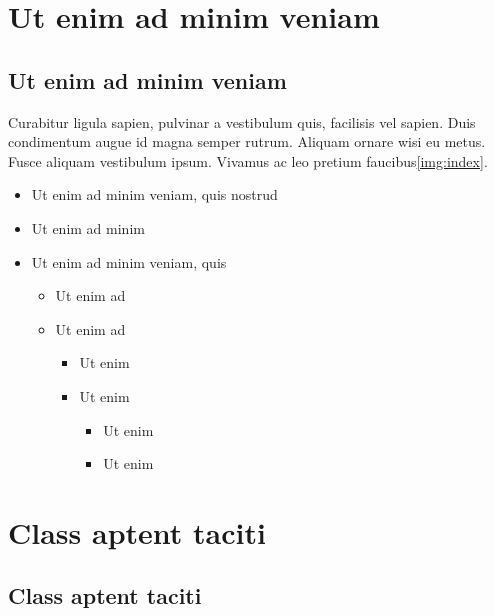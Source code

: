 \section{Ut enim ad minim veniam}

\lipsum[2-4]

\subsection{Ut enim ad minim veniam}

Curabitur ligula sapien, pulvinar a vestibulum quis, facilisis vel sapien. Duis condimentum augue id magna semper rutrum. Aliquam ornare wisi eu metus. Fusce aliquam vestibulum ipsum. Vivamus ac leo pretium faucibus\ref{img:index}.

\begin{itemize}
    \item Ut enim ad minim veniam, quis nostrud
    \item Ut enim ad minim 
    \item Ut enim ad minim veniam, quis 
    \begin{itemize}
        \item Ut enim ad
        \item Ut enim ad
        \begin{itemize}
            \item Ut enim 
            \item Ut enim 
            \begin{itemize}
            \item Ut enim 
            \item Ut enim 
        \end{itemize}
        \end{itemize}
    \end{itemize}
\end{itemize}

\section{Class aptent taciti}

\lipsum[2]

\subsection{Class aptent taciti}

